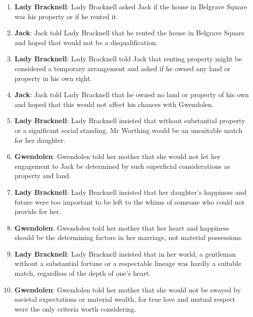 \documentclass[10pt]{article}
\begin{document}
\begin{enumerate}\setlength{\itemsep}{1pt}\small

\item \textbf{Lady Bracknell}: Lady Bracknell asked Jack if the house in Belgrave Square was his property or if he rented it.

\item \textbf{Jack}: Jack told Lady Bracknell that he rented the house in Belgrave Square and hoped that would not be a disqualification.

\item \textbf{Lady Bracknell}: Lady Bracknell told Jack that renting property might be considered a temporary arrangement and asked if he owned any land or property in his own right.

\item \textbf{Jack}: Jack told Lady Bracknell that he owned no land or property of his own and hoped that this would not affect his chances with Gwendolen.

\item \textbf{Lady Bracknell}: Lady Bracknell insisted that without substantial property or a significant social standing, Mr Worthing would be an unsuitable match for her daughter.

\item \textbf{Gwendolen}: Gwendolen told her mother that she would not let her engagement to Jack be determined by such superficial considerations as property and land.

\item \textbf{Lady Bracknell}: Lady Bracknell insisted that her daughter's happiness and future were too important to be left to the whims of someone who could not provide for her.

\item \textbf{Gwendolen}: Gwendolen told her mother that her heart and happiness should be the determining factors in her marriage, not material possessions.

\item \textbf{Lady Bracknell}: Lady Bracknell insisted that in her world, a gentleman without a substantial fortune or a respectable lineage was hardly a suitable match, regardless of the depth of one's heart.

\item \textbf{Gwendolen}: Gwendolen told her mother that she would not be swayed by societal expectations or material wealth, for true love and mutual respect were the only criteria worth considering.


\end{enumerate}
\end{document}

